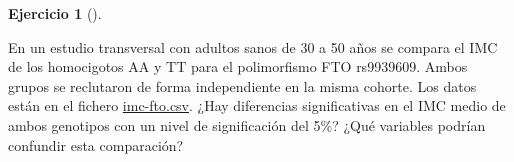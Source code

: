 \documentclass[
  spanish,
  a4paper,
]{scrreport}
\theoremstyle{definition}
\newtheorem{exercise}{Ejercicio}[chapter]
\theoremstyle{remark}
\begin{document}
\begin{exercise}[]\protect\hypertarget{exr-contraste-ia-comparacion-medias-imc-fto}{}\label{exr-contraste-ia-comparacion-medias-imc-fto}

En un estudio transversal con adultos sanos de 30 a 50 años se compara
el IMC de los homocigotos AA y TT para el polimorfismo FTO rs9939609.
Ambos grupos se reclutaron de forma independiente en la misma cohorte.
Los datos están en el fichero \href{datos/imc-fto.csv}{imc-fto.csv}.
¿Hay diferencias significativas en el IMC medio de ambos genotipos con
un nivel de significación del 5\%? ¿Qué variables podrían confundir esta
comparación?

\end{exercise}

\begin{tcolorbox}[enhanced jigsaw, arc=.35mm, bottomrule=.15mm, bottomtitle=1mm, breakable, colback=white, colbacktitle=quarto-callout-tip-color!10!white, colframe=quarto-callout-tip-color-frame, coltitle=black, left=2mm, leftrule=.75mm, opacityback=0, opacitybacktitle=0.6, rightrule=.15mm, title=\textcolor{quarto-callout-tip-color}{\faLightbulb}\hspace{0.5em}{Solución}, titlerule=0mm, toprule=.15mm, toptitle=1mm]


\end{tcolorbox}
\end{document}
